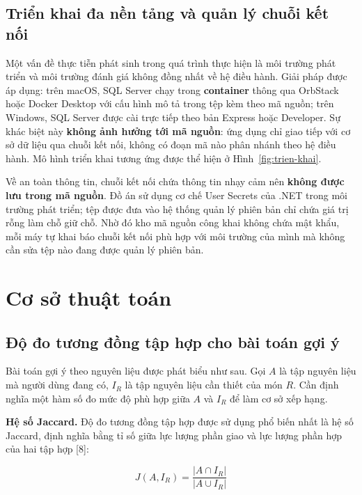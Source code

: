 \subsection{Triển khai đa nền tảng và quản lý chuỗi kết nối}

Một vấn đề thực tiễn phát sinh trong quá trình thực hiện là môi trường phát triển
và môi trường đánh giá không đồng nhất về hệ điều hành. Giải pháp được áp dụng:
trên macOS, SQL Server chạy trong \textbf{container} thông qua OrbStack hoặc
Docker Desktop với cấu hình mô tả trong tệp  kèm theo mã
nguồn; trên Windows, SQL Server được cài trực tiếp theo bản Express hoặc
Developer. Sự khác biệt này \textbf{không ảnh hưởng tới mã nguồn}: ứng dụng chỉ
giao tiếp với cơ sở dữ liệu qua chuỗi kết nối, không có đoạn mã nào phân nhánh
theo hệ điều hành. Mô hình triển khai tương ứng được thể hiện ở
Hình~\ref{fig:trien-khai}.

Về an toàn thông tin, chuỗi kết nối chứa thông tin nhạy cảm nên \textbf{không
được lưu trong mã nguồn}. Đồ án sử dụng cơ chế User Secrets của .NET trong môi
trường phát triển; tệp  được đưa vào hệ thống quản lý
phiên bản chỉ chứa giá trị rỗng làm chỗ giữ chỗ. Nhờ đó kho mã nguồn công khai
không chứa mật khẩu, mỗi máy tự khai báo chuỗi kết nối phù hợp với môi trường của
mình mà không cần sửa tệp nào đang được quản lý phiên bản.

\section{Cơ sở thuật toán}
\label{sec:co-so-thuat-toan}

\subsection{Độ đo tương đồng tập hợp cho bài toán gợi ý}
\label{sec:do-do}

Bài toán gợi ý theo nguyên liệu được phát biểu như sau. Gọi $A$ là tập nguyên
liệu mà người dùng đang có, $I_R$ là tập nguyên liệu cần thiết của món $R$. Cần
định nghĩa một hàm số đo mức độ phù hợp giữa $A$ và $I_R$ để làm cơ sở xếp hạng.

\textbf{Hệ số Jaccard.} Độ đo tương đồng tập hợp được sử dụng phổ biến nhất là hệ
số Jaccard, định nghĩa bằng tỉ số giữa lực lượng phần giao và lực lượng phần hợp
của hai tập hợp [8]:

\begin{equation}
J(A, I_R) = \frac{|A \cap I_R|}{|A \cup I_R|}
\label{eq:jaccard}
\end{equation}

